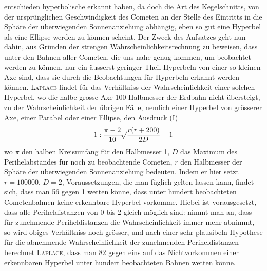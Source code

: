entschieden hyperbolische erkannt haben, da doch die Art des Kegelschnitts, von der ursprünglichen
Geschwindigkeit des Cometen an der Stelle des Eintritts in die Sphäre der überwiegenden Sonnenanziehung
abhängig, eben so gut eine Hyperbel als eine Ellipse werden zu können scheint. Der Zweck des Aufsatzes
geht nun dahin, aus Gründen der strengen Wahrscheinlichkeitsrechnung zu beweisen, dass unter den Bahnen
aller Cometen, die uns nahe genug kommen, um beobachtet werden zu können, nur ein äusserst geringer Theil
Hyperbeln von einer so kleinen Axe sind, dass sie durch die Beobachtungen für Hyperbeln erkannt werden
können. \textsc{Laplace} findet für das Verhältniss der Wahrscheinlichkeit einer solchen Hyperbel, wo
die halbe grosse Axe 100 Halbmesser der Erdbahn nicht übersteigt, zu der Wahrscheinlichkeit der übrigen
Fälle, nemlich einer Hyperbel von grösserer Axe, einer Parabel oder einer Ellipse, den Ausdruck (I)
\[1 : \frac{\pi-2}{10}\mathord{{}^{}\!\surd}\frac{r(r+200)}{2D} - 1\]
wo $\pi$ den halben Kreisumfang für den Halbmesser 1, $D$ das Maximum des Perihelabstandes für noch zu
beobachtende Cometen, $r$ den Halbmesser der Sphäre der überwiegenden Sonnenanziehung bedeuten. Indem
er hier setzt $r = 100000$, $D = 2$, Voraussetzungen, die man füglich gelten lassen kann, findet sich, dass
man 56 gegen 1 wetten könne, dass unter hundert beobachteten Cometenbahnen keine erkennbare Hyperbel
vorkomme. Hiebei ist vorausgesetzt, dass alle Periheldistanzen von 0 bis 2 gleich möglich sind: nimmt man
an, dass für zunehmende Periheldistanzen die Wahrscheinlichkeit immer mehr abnimmt, so wird obiges
Verhältniss noch grösser, und nach einer sehr plausibeln Hypothese für die abnehmende Wahrscheinlichkeit
der zunehmenden Periheldistanzen berechnet \textsc{Laplace}, dass man 82 gegen eins auf das Nichtvorkommen
einer erkennbaren Hyperbel unter hundert beobachteten Bahnen wetten könne.

